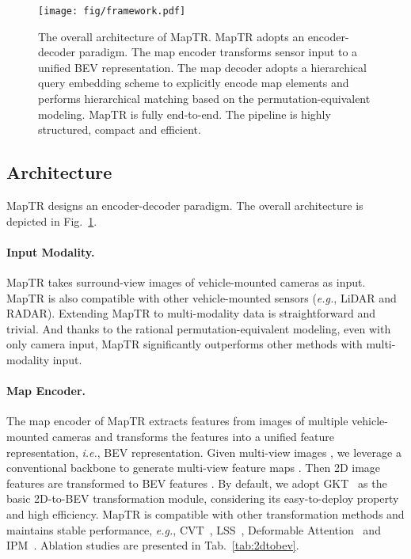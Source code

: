 \documentclass{article} \usepackage{iclr2023_conference,times}
\def\eg{\emph{e.g.}} \def\Eg{\emph{E.g.}}
\def\ie{\emph{i.e.}} \def\Ie{\emph{I.e.}}
\begin{document}
\begin{figure}[]
    \centering
    \texttt{[image: fig/framework.pdf]}
    \caption{The overall architecture of MapTR. MapTR adopts an encoder-decoder paradigm. The map encoder transforms sensor input to a unified BEV representation. The map decoder adopts a hierarchical query embedding scheme to explicitly encode  map elements and performs hierarchical matching based on the permutation-equivalent modeling. MapTR is fully end-to-end. The pipeline is highly structured, compact and efficient.}
    \label{fig:framework}
    \vspace*{-0.5cm}
\end{figure}



\subsection{Architecture \label{sec:architecture}}
MapTR designs an encoder-decoder paradigm. The overall architecture is depicted in Fig.~\ref{fig:framework}.

\paragraph{Input Modality.}
MapTR takes surround-view images of vehicle-mounted cameras as input.
MapTR is also compatible with other vehicle-mounted sensors (\eg, LiDAR and RADAR).
Extending MapTR to multi-modality data is straightforward and trivial.
And thanks to the rational permutation-equivalent modeling, even with only camera input, MapTR significantly outperforms other methods with multi-modality input.

\paragraph{Map Encoder.}
The map encoder of MapTR extracts features from images of multiple vehicle-mounted cameras and transforms the features into a unified feature representation, \ie, BEV representation.
Given multi-view images ,
we leverage a conventional backbone to generate multi-view feature maps .
Then 2D image features  are transformed to BEV features  .
By default, we adopt GKT~\citep{gkt} as the basic 2D-to-BEV transformation module, considering its easy-to-deploy property and high efficiency. MapTR is compatible with other transformation methods and maintains stable performance, \eg, CVT~\citep{cvt}, LSS~\citep{lss,liu2022bevfusion,bevdepth,bevdet}, Deformable Attention~\citep{bevformer,deformdetr} and IPM~\citep{ipm}. Ablation studies are presented in Tab.~\ref{tab:2dtobev}.
\end{document}
